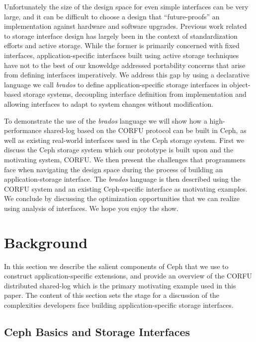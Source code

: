 \documentclass[10pt,twocolumn]{article}
\begin{document}
Unfortunately the size of the design space for even simple interfaces can
be very large, and it can be difficult to choose a design that
``future-proofs'' an
implementation against hardware and software upgrades.
Previous work related to storage interface design has largely been in the
context of standardization efforts and active storage. While the former is
primarily concerned with fixed interfaces, application-specific interfaces
built using active storage techniques have not to the best of our knoweldge
addressed portability concerns that arise from defining interfaces
imperatively. We address this gap by using a declarative language we call
\emph{brados} to define application-specific storage interfaces in
object-based storage systems, decoupling interface definition from
implementation and allowing interfaces to adapt to system changes without
modification.

To demonstrate the use of the \emph{brados} language we will show how a
high-performance shared-log based on the CORFU protocol can be built in Ceph, as well
as existing real-world interfaces used in the Ceph storage system. First we
discuss the Ceph storage system which our prototype is built upon and the 
motivating system, CORFU. We then present the challenges that programmers face
when navigating the design space during the process of building an
application-storage interface. The \emph{brados} language is then described
using the CORFU system and an existing Ceph-specific interface as motivating examples.
We conclude by discussing the optimization opportunities that we can realize
using analysis of interfaces. We hope you enjoy the show.

\section{Background}

In this section we describe the salient components of Ceph that we use to
construct application-specific extensions, and provide an overview of the
CORFU distributed shared-log which is the primary motivating example used in
this paper. The content of this section sets the stage for a discussion of the
complexities developers face building application-specific storage interfaces.

\subsection{Ceph Basics and Storage Interfaces}
\label{sec:objclass}
\end{document}
